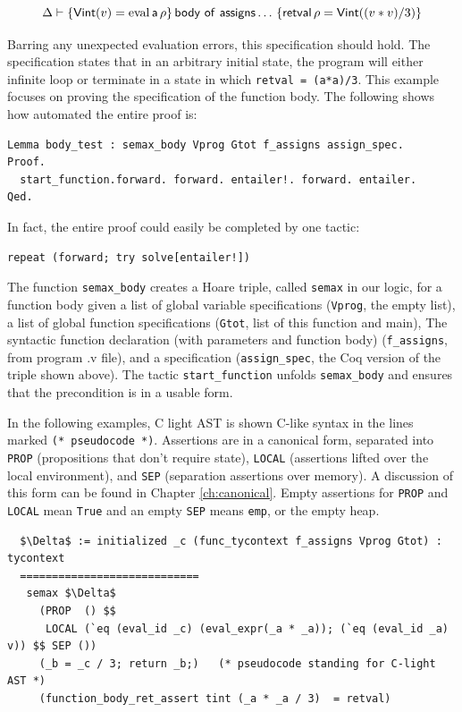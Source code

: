 \documentclass{puthesis}
\begin{document}
\[\Delta \vdash \{\mathsf{Vint}(v)=\mathrm{eval}\,\mathsf{a}\,\rho\}\,\mathsf{body~of~assigns}\ldots\,\{\mathsf{retval}\,\rho = \mathsf{Vint}((v * v) /
3)\}\]

Barring any unexpected evaluation errors, this specification should hold.
The specification states that in an arbitrary initial state, the program will either
infinite loop or terminate in a state in which \lstinline|retval = (a*a)/3|. This
example focuses on proving the specification of the function
body. The following shows
how automated the entire proof is:

\begin{lstlisting}
Lemma body_test : semax_body Vprog Gtot f_assigns assign_spec.
Proof. 
  start_function.forward. forward. entailer!. forward. entailer. 
Qed.
\end{lstlisting}

In fact, the entire proof could easily be completed by one tactic:

\begin{lstlisting}
repeat (forward; try solve[entailer!])
\end{lstlisting}

The function \lstinline|semax_body| creates a Hoare triple, called
\lstinline|semax| in our logic, for a
function body given a list of global variable specifications
(\lstinline|Vprog|, the empty list), a list of global function
specifications (\lstinline|Gtot|, list of this function and main), The
syntactic function declaration (with parameters and function body)
(\lstinline|f_assigns|, from program .v file), and a
specification (\lstinline|assign_spec|, the Coq version of the triple
shown above). The tactic \lstinline|start_function| unfolds
\lstinline|semax_body| and ensures that the precondition is in a
usable form.  

In the following examples, C light AST is shown C-like syntax
in the lines marked \lstinline|(* pseudocode *)|. Assertions are in a
canonical form, separated into \lstinline|PROP| (propositions that
don't require state), \lstinline|LOCAL| (assertions lifted over the
local environment), and \lstinline|SEP| (separation assertions over
memory). A discussion of this form can
be found in Chapter \ref{ch:canonical}. Empty assertions for
\lstinline|PROP| and \lstinline|LOCAL| mean \lstinline|True| and an
empty \lstinline|SEP| means \lstinline|emp|, or the empty heap.

\begin{lstlisting}
  $\Delta$ := initialized _c (func_tycontext f_assigns Vprog Gtot) : tycontext
  ============================
   semax $\Delta$  
     (PROP  () $$ 
      LOCAL (`eq (eval_id _c) (eval_expr(_a * _a)); (`eq (eval_id _a) v)) $$ SEP ()) 
     (_b = _c / 3; return _b;)   (* pseudocode standing for C-light AST *) 
     (function_body_ret_assert tint (_a * _a / 3)  = retval)
\end{lstlisting}
\end{document}
